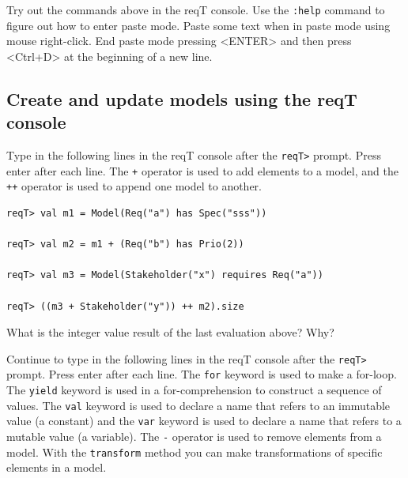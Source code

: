 \documentclass[11pt]{article}
\begin{document}
{\begin{framed}\noindent
Try out the commands above in the reqT console. Use the \verb+:help+ command to figure out how to enter paste mode. Paste some text when in paste mode using mouse right-click. End paste mode pressing <ENTER> and then press <Ctrl+D> at the beginning of a new line. %
\end{framed}}

\subsection{Create and update models using the reqT console}

\begin{framed}\noindent
Type in the following lines in the reqT console after the \verb+reqT>+ prompt. Press enter after each line. The \verb?+? operator is used to add elements to a model, and the  \verb?++? operator is used to append one model to another.

{\small\begin{verbatim}
reqT> val m1 = Model(Req("a") has Spec("sss"))

reqT> val m2 = m1 + (Req("b") has Prio(2))

reqT> val m3 = Model(Stakeholder("x") requires Req("a"))

reqT> ((m3 + Stakeholder("y")) ++ m2).size
\end{verbatim}}


\noindent What is the integer value result of the last evaluation above? Why?
\newline 
\newline
\newline \underline{\hspace{10cm}}

\vspace{7mm}
\noindent Continue to type in the following lines in the reqT console after the \verb+reqT>+ prompt. Press enter after each line. The \verb+for+ keyword is used to make a for-loop. The \verb+yield+ keyword is used in a for-comprehension to construct a sequence of values.  The \verb+val+ keyword is used to declare a name that refers to an immutable value (a constant) and the \verb+var+ keyword is used to declare a name that refers to a mutable value (a variable). The \verb?-? operator is used to remove elements from a model. With the \verb+transform+ method you can make transformations of specific elements in a model. 



\end{framed}
\end{document}
